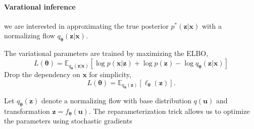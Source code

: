 \documentclass[../main.tex]{subfiles}
\begin{document}
\paragraph{Varational inference} we are interested in approximating
the true posterior $p^{*}(\boldsymbol{z} | \boldsymbol{x})$ with a normalizing flow $q_{\boldsymbol{\theta}}(\boldsymbol{z} | \boldsymbol{x})$.

The variational parameters are trained by maximizing the ELBO, 
\[
L(\boldsymbol{\theta}) = \mathbb{E}_{q_{\boldsymbol{\theta}}(\boldsymbol{z} | \boldsymbol{x})} \left[ \log p(\boldsymbol{x} | \boldsymbol{z}) + \log p(\boldsymbol{z}) - \log q_{\boldsymbol{\theta}}(\boldsymbol{z} | \boldsymbol{x}) \right] 
\]
Drop the dependency on $\boldsymbol{x}$ for simplicity,
\[
L(\boldsymbol{\theta}) = \mathbb{E}_{q_{\boldsymbol{\theta}}(\boldsymbol{z})} \left[ \ell_{\boldsymbol{\theta}}(\boldsymbol{z}) \right] .
\]

Let $q_{\boldsymbol{\theta}}(\boldsymbol{z})$ denote a normalizing flow with base distribution $q(\boldsymbol{u})$ and transformation $\boldsymbol{z} = f_{\boldsymbol{\theta}}(\boldsymbol{u})$.
The reparameterization trick allows us to optimize
the parameters using stochastic gradients
\end{document}
